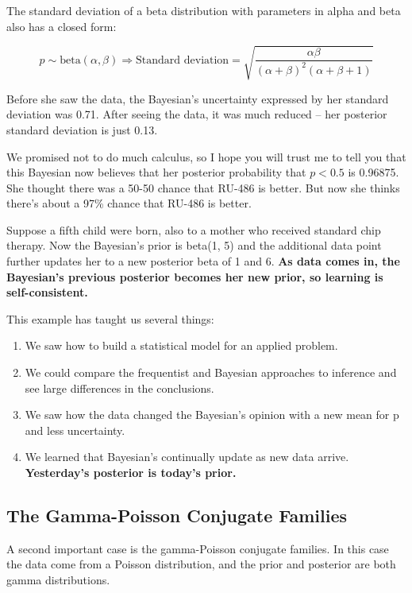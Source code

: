 \documentclass[]{book}
\theoremstyle{definition}
\theoremstyle{definition}
\theoremstyle{remark}
\begin{document}
The standard deviation of a beta distribution with parameters in alpha
and beta also has a closed form:

\[p \sim \text{beta}(\alpha,\beta) \Rightarrow \text{Standard deviation} = \sqrt{\frac{\alpha\beta}{(\alpha+\beta)^2(\alpha+\beta+1)}}\]

Before she saw the data, the Bayesian's uncertainty expressed by her
standard deviation was 0.71. After seeing the data, it was much reduced
-- her posterior standard deviation is just 0.13.

We promised not to do much calculus, so I hope you will trust me to tell
you that this Bayesian now believes that her posterior probability that
\(p < 0.5\) is 0.96875. She thought there was a 50-50 chance that RU-486
is better. But now she thinks there's about a 97\% chance that RU-486 is
better.

Suppose a fifth child were born, also to a mother who received standard
chip therapy. Now the Bayesian's prior is beta(1, 5) and the additional
data point further updates her to a new posterior beta of 1 and 6.
\textbf{As data comes in, the Bayesian's previous posterior becomes her
new prior, so learning is self-consistent.}

This example has taught us several things:

\begin{enumerate}
\def\labelenumi{\arabic{enumi}.}
\item
  We saw how to build a statistical model for an applied problem.
\item
  We could compare the frequentist and Bayesian approaches to inference
  and see large differences in the conclusions.
\item
  We saw how the data changed the Bayesian's opinion with a new mean for
  p and less uncertainty.
\item
  We learned that Bayesian's continually update as new data arrive.
  \textbf{Yesterday's posterior is today's prior.}
\end{enumerate}

\subsection{The Gamma-Poisson Conjugate
Families}\label{the-gamma-poisson-conjugate-families}

A second important case is the gamma-Poisson conjugate families. In this
case the data come from a Poisson distribution, and the prior and
posterior are both gamma distributions.
\end{document}
